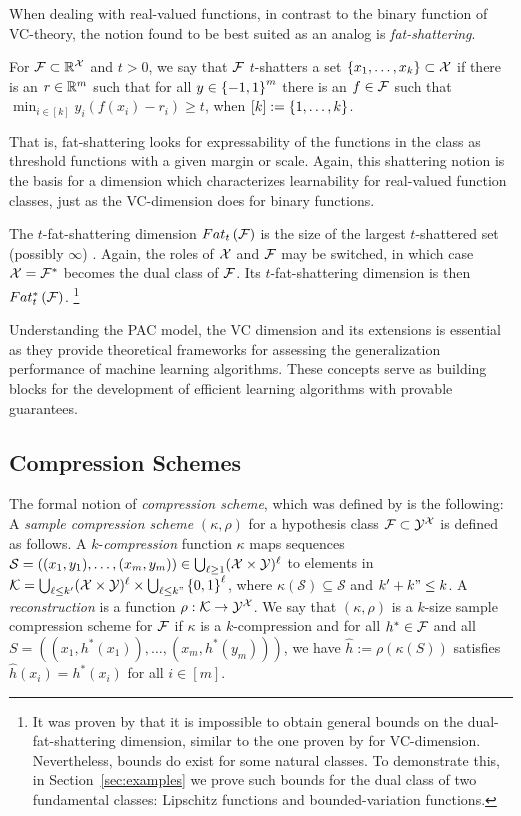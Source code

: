 \documentclass[12pt,a4paper,oneside,onecolumn]{book}
\begin{document}
When dealing with real-valued functions, in contrast to the binary function of VC-theory, the notion found to be best suited as an analog is  \emph{fat-shattering}.
\begin{definition}
For $\mathcal{F}\subset\mathbb{R}^{\mathcal{X}}$ and $t>0$,
we say that $\mathcal{F}$ $t$-shatters
a set $\left\{ x_1,\ldots,x_k \right\}\subset\mathcal{X}$
if
there is an $r\in\mathbb{R}^m$ such that for all $y\in\left\{ -1,1 \right\}^m$
there is an $f\in\mathcal{F}$ such that
$ \min_{i\in[k]} y_i(f(x_i)-r_i)\ge t$, 
when 
$[k]:=\left\{ 1,\ldots,k \right\}$.
\end{definition}
That is, fat-shattering looks for expressability of the functions in the class as threshold functions with a given margin or scale.
Again, this shattering notion is the basis for a dimension which characterizes learnability for real-valued function classes, just as the VC-dimension does for binary functions.
\begin{definition}
The $t$-fat-shattering dimension 
$Fat_{t}\left(\mathcal{F}\right)$
is the size of the largest $t$-shattered set (possibly $\infty$) . 
Again, the roles of $\mathcal{X}$ and $\mathcal{F}$ may be switched, 
in which case $\mathcal{X}=\mathcal{F}^*$ becomes the dual class of $\mathcal{F}$.
Its $t$-fat-shattering dimension is then 
$Fat^*_{t}\left(\mathcal{F}\right)$.
\footnote{It was proven by \citet{DBLP:journals/corr/abs-2108-10037} that it is impossible to obtain general bounds on the dual-fat-shattering dimension, similar to the one proven by \citet{MR723955} for VC-dimension. 
Nevertheless, bounds do exist for some natural classes. To demonstrate this, in Section~\ref{sec:examples} we prove such bounds for the dual class of two fundamental classes: Lipschitz functions and bounded-variation functions.}
\end{definition}

Understanding the PAC model, the VC dimension and its extensions is essential as they provide theoretical frameworks for assessing the generalization performance of machine learning algorithms. These concepts serve as building blocks for the development of efficient learning algorithms with provable guarantees.

\subsection{Compression Schemes}

The formal notion of \emph{compression scheme}, which was defined by \citet{littlestone1986relating} is the following:
A {\em sample compression scheme} $(\kappa,\rho)$ for a hypothesis
class $\mathcal{F}\subset\mathcal{Y}^{\mathcal{X}}$
is defined as follows.
A $k$-{\em compression} function $\kappa$
maps sequences $\mathcal{S}=((x_1,y_1),\ldots,(x_m,y_m))\in\bigcup_{\ell\ge1}(\mathcal{X}\times\mathcal{Y})^\ell$
to elements in
$\mathcal{K}=\bigcup_{\ell\le k'}(\mathcal{X}\times\mathcal{Y})^\ell
\times
\bigcup_{\ell\le k"}\left\{ 0,1 \right\}^\ell$,
where $\kappa(\mathcal{S})\subseteq \mathcal{S}$ and $k'+k"\le k$.
A {\em reconstruction} is a function $\rho:\mathcal{K}\to\mathcal{Y}^{\mathcal{X}}$.
We say that $(\kappa,\rho)$ is a $k$-size sample compression
scheme for $\mathcal{F}$
if
$\kappa$ is a $k$-compression and
for all
$h^*\in\mathcal{F}$
and all
$S=((x_1,h^{*}(x_1)),\ldots,(x_m,h^{*}(y_m)))$,
we have
$\hat h:=\rho(\kappa(S))$
satisfies $\hat h(x_i)=h^*(x_i)$ for all $i\in[m]$.
\end{document}
